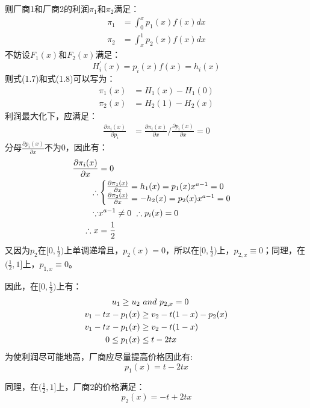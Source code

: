 则厂商1和厂商2的利润$\pi_1$和$\pi_2$满足：
\begin{align}
    \pi_1 &=\int_0^x p_1(x)f(x)dx \\
    \pi_2 &= \int_x^1 p_2(x)f(x)dx 
\end{align}
不妨设$F_1(x)$和$F_2(x)$满足：
\begin{equation*}
    H_i^{'} (x) = p_i(x)f(x) = h_i(x)
\end{equation*}
则式(1.7)和式(1.8)可以写为：
\begin{align}
    \pi_1(x) &=H_1(x)-H_1(0) \\
    \pi_2(x) &=H_2(1)-H_2(x)
\end{align}
利润最大化下，应满足：
\begin{align}
    \frac{\partial \pi_i(x) }{\partial p_i} &=\frac{\partial \pi_i(x)}{\partial x}\bigg/\frac{\partial p_i(x)}{\partial x}=0 
\end{align}
分母$\frac{\partial p_i(x)}{\partial x}$不为0，因此有：
\begin{align}
    \frac{\partial \pi_i(x)}{\partial x} &=0 \notag\\
    \therefore &\begin{cases}
      \frac{\partial \pi_1(x)}{\partial x} = h_1(x) =p_1(x)x^{a-1}=0  \\
      \frac{\partial \pi_2(x)}{\partial x} = -h_2(x) =p_2(x)x^{a-1}=0
\end{cases}  \notag \\
    \because & x^{a-1} \neq 0  \ \therefore p_i(x) =0\notag \\
    \therefore x &= \frac{1}{2} 
\end{align}
又因为$p_2$在$[0,\frac{1}{2})$上单调递增且，$p_2(x)=0$，所以在$[0,\frac{1}{2})$上，$p_{2,x}\equiv0$；同理，在$(\frac{1}{2},1]$上，$p_{1,x}\equiv0$。

因此，在$[0,\frac{1}{2})$上有：
\begin{align}
    u_1 \geq u_2 & \ and \ p_{2,x}=0 \notag \\
    v_1-tx-p_1(x) &\geq v_2-t(1-x)-p_2(x) \notag \\
    v_1-tx-p_1(x) &\geq v_2-t(1-x) \notag \\
   0\leq p_1(x) & \leq t-2tx 
\end{align}
为使利润尽可能地高，厂商应尽量提高价格因此有:
\begin{equation}
    p_1(x) = t-2tx 
\end{equation}

同理，在$(\frac{1}{2},1]$上，厂商2的价格满足：
\begin{equation}
    p_2(x) = -t+2tx 
\end{equation}

